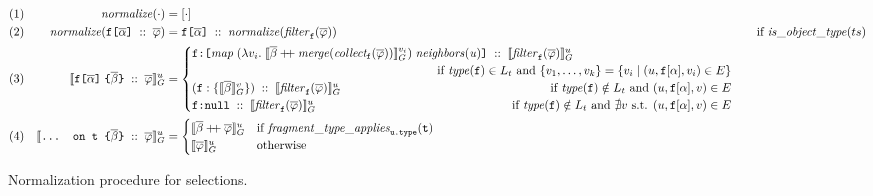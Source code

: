 \begin{figure*}[t]
\small
    \centering
    \begin{align*}
    & (1) & \normalize{\cdot} &= [\cdot] \\
    & (2) & \normalize{\fld\; ::\; \queries} &= 
       	\fld \; ::\; \normalize{\filter{\queries}{\fkey}} 
        & \text{if } \mathit{is\_object\_type}(ts)\\       
    & (3) & \evalu{\nfld{\overline{\beta}} \; ::\; \queries} &=
    \begin{cases}
        \resp{\texttt{[} \mathit{map}\; (\lambda v_{i}.\; \eval{\overline{\beta} \mdoubleplus \mathit{merge (collect_\fkey (\queries))}}{v_{i}})\; \mathit{neighbors(u)} \texttt{]}} \; :: \; \evalfilteru{\queries}{\fkey} \\  
        \hfill \text{ if } 
            \mathit{type(\fkey)} \in L_{t} \text{ and } \{v_{1}, \ldots, v_{k}\} = 
        \{v_{i} \mid (u, \fkey[\alpha], v_{i}) \in E\} \\
    (\fkey:\{\eval{\subqueries{\beta}}{v}\})\; :: \; \evalfilteru{\queries}{\fkey}  
        \hfill \text{ if } 
        \mathit{type(\fkey)} \notin L_{t} \text{ and } (u, \fkey[\alpha], v) \in E \\
    \resp{\nval}\; :: \; \evalfilteru{\queries}{\fkey} 
    \qquad \qquad \qquad \qquad \qquad \qquad \qquad \qquad
    \text{ if } \mathit{type(\fkey)} \notin L_{t}  \text{ and } \nexists v \text{ s.t. }  (u, \fkey[\alpha], v) \in E \\
    \end{cases}\\
    & (4) & \evalu{\ifrag{t}{\overline{\beta}}\; ::\; \queries} &= \begin{cases}
    \evalu{\overline{\beta} \mdoubleplus \queries} & 
    \text{if }\mathit{fragment\_type\_applies}_{\texttt{u.type}}(\texttt{t})\\
    \evalu{\queries} & \text{otherwise}
    \end{cases}
    \end{align*}
    \caption{Normalization procedure for \gql selections. }
\label{fig:normalize}
\end{figure*}


